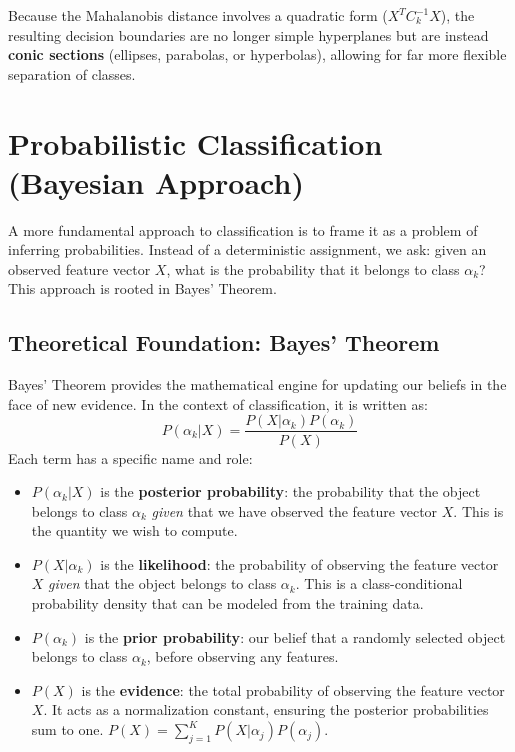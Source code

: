 Because the Mahalanobis distance involves a quadratic form ($X^T C_k^{-1} X$), the resulting decision boundaries are no longer simple hyperplanes but are instead \textbf{conic sections} (ellipses, parabolas, or hyperbolas), allowing for far more flexible separation of classes.

\section{Probabilistic Classification (Bayesian Approach)}
\label{sec:probabilistic_classifiers}
A more fundamental approach to classification is to frame it as a problem of inferring probabilities. Instead of a deterministic assignment, we ask: given an observed feature vector $X$, what is the probability that it belongs to class $\alpha_k$? This approach is rooted in Bayes' Theorem.

\subsection*{Theoretical Foundation: Bayes' Theorem}
Bayes' Theorem provides the mathematical engine for updating our beliefs in the face of new evidence. In the context of classification, it is written as:
$$ P(\alpha_k | X) = \frac{P(X | \alpha_k) P(\alpha_k)}{P(X)} $$
Each term has a specific name and role:
\begin{itemize}
    \item \textbf{$P(\alpha_k | X)$} is the \textbf{posterior probability}: the probability that the object belongs to class $\alpha_k$ \textit{given} that we have observed the feature vector $X$. This is the quantity we wish to compute.
    \item \textbf{$P(X | \alpha_k)$} is the \textbf{likelihood}: the probability of observing the feature vector $X$ \textit{given} that the object belongs to class $\alpha_k$. This is a class-conditional probability density that can be modeled from the training data.
    \item \textbf{$P(\alpha_k)$} is the \textbf{prior probability}: our belief that a randomly selected object belongs to class $\alpha_k$, before observing any features.
    \item \textbf{$P(X)$} is the \textbf{evidence}: the total probability of observing the feature vector $X$. It acts as a normalization constant, ensuring the posterior probabilities sum to one. $P(X) = \sum_{j=1}^{K} P(X | \alpha_j) P(\alpha_j)$.
\end{itemize}

